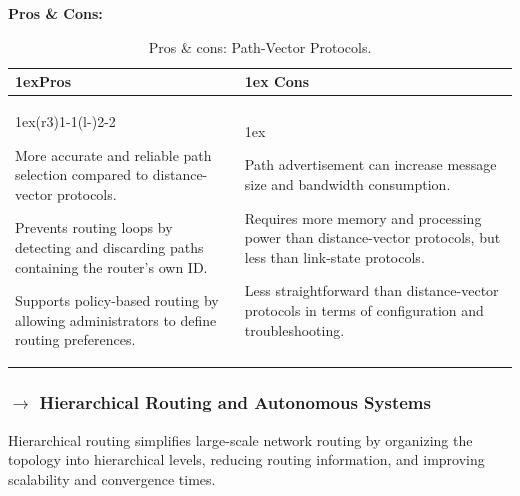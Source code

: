 \vspace{1em}
\noindent \textbf{Pros \& Cons:}
\begin{table}[H]
    \begin{tabularx}{\linewidth}{>{\parskip1ex}X@{\kern4\tabcolsep}>{\parskip1ex}X}
    \toprule
    \hfil\bfseries Pros
    &
    \hfil\bfseries Cons 
    \\\cmidrule(r{3\tabcolsep}){1-1}\cmidrule(l{-\tabcolsep}){2-2}
    
    More accurate and reliable path selection compared to distance-vector protocols.\par
    Prevents routing loops by detecting and discarding paths containing the router's own ID.\par
    Supports policy-based routing by allowing administrators to define routing preferences.
    &
    
    Path advertisement can increase message size and bandwidth consumption.\par
    Requires more memory and processing power than distance-vector protocols, but less than link-state protocols.\par
    Less straightforward than distance-vector protocols in terms of configuration and troubleshooting.
    \\\bottomrule
    \end{tabularx}
    \caption{Pros \& cons: Path-Vector Protocols.}
\end{table}

\subsubsection[4.3.2 Hierarchical Routing and Autonomous Systems]{$\rightarrow$ Hierarchical Routing and Autonomous Systems}
\label{subsec:hierarchical-routing-autonomous-systems}

Hierarchical routing simplifies large-scale network routing by organizing the topology into hierarchical levels, reducing routing information, and improving scalability and convergence times.

